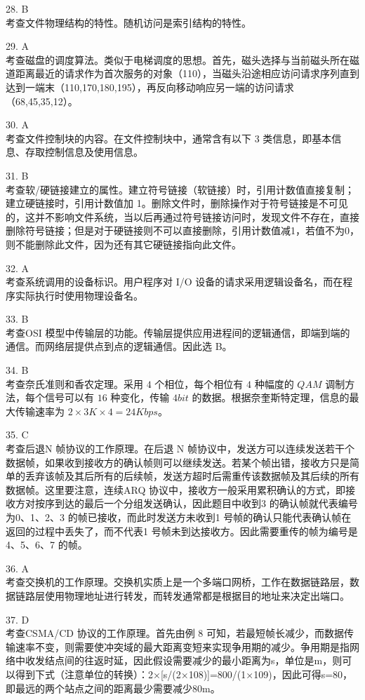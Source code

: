 28. B \\
考查文件物理结构的特性。随机访问是索引结构的特性。

29. A \\
考查磁盘的调度算法。类似于电梯调度的思想。首先，磁头选择与当前磁头所在磁道距离最近的请求作为首次服务的对象（110），当磁头沿途相应访问请求序列直到达到一端末（110,170,180,195），再反向移动响应另一端的访问请求（68,45,35,12）。

30. A \\
考查文件控制块的内容。在文件控制块中，通常含有以下 3 类信息，即基本信息、存取控制信息及使用信息。

31. B \\
考查软/硬链接建立的属性。建立符号链接（软链接）时，引用计数值直接复制；建立硬链接时，引用计数值加 1。删除文件时，删除操作对于符号链接是不可见的，这并不影响文件系统，当以后再通过符号链接访问时，发现文件不存在，直接删除符号链接；但是对于硬链接则不可以直接删除，引用计数值减1，若值不为0，则不能删除此文件，因为还有其它硬链接指向此文件。

32. A \\
考查系统调用的设备标识。用户程序对 I/O 设备的请求采用逻辑设备名，而在程序实际执行时使用物理设备名。

33. B \\
考查OSI 模型中传输层的功能。传输层提供应用进程间的逻辑通信，即端到端的通信。而网络层提供点到点的逻辑通信。因此选 B。

34. B \\
考查奈氏准则和香农定理。采用 $4$ 个相位，每个相位有 $4$ 种幅度的 $QAM$ 调制方法，每个信号可以有 $16$ 种变化，传输 $4bit$ 的数据。根据奈奎斯特定理，信息的最大传输速率为 $2\times3K\times4=24Kbps$。

35. C \\
考查后退N 帧协议的工作原理。在后退 N 帧协议中，发送方可以连续发送若干个数据帧，如果收到接收方的确认帧则可以继续发送。若某个帧出错，接收方只是简单的丢弃该帧及其后所有的后续帧，发送方超时后需重传该数据帧及其后续的所有数据帧。这里要注意，连续ARQ 协议中，接收方一般采用累积确认的方式，即接收方对按序到达的最后一个分组发送确认，因此题目中收到3 的确认帧就代表编号为0、1、2、3 的帧已接收，而此时发送方未收到1 号帧的确认只能代表确认帧在返回的过程中丢失了，而不代表1 号帧未到达接收方。因此需要重传的帧为编号是4、5、6、7 的帧。

36. A \\
考查交换机的工作原理。交换机实质上是一个多端口网桥，工作在数据链路层，数据链路层使用物理地址进行转发，而转发通常都是根据目的地址来决定出端口。

37. D \\
考查CSMA/CD 协议的工作原理。首先由例 8 可知，若最短帧长减少，而数据传输速率不变，则需要使冲突域的最大距离变短来实现争用期的减少。争用期是指网络中收发结点间的往返时延，因此假设需要减少的最小距离为s，单位是m，则可以得到下式（注意单位的转换）：2×[s/(2×108)]=800/(1×109)，因此可得s=80，即最远的两个站点之间的距离最少需要减少80m。

